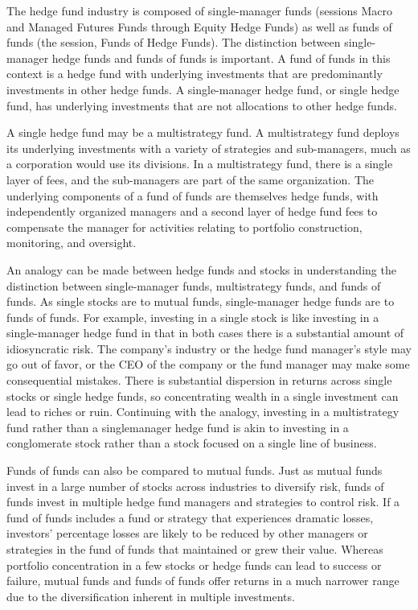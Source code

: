 \documentclass[11pt]{article}
\begin{document}
The hedge fund industry is composed of single-manager funds (sessions Macro and Managed Futures Funds through Equity Hedge Funds) as well as funds of funds (the session, Funds of Hedge Funds). The distinction between single-manager hedge funds and funds of funds is important. A fund of funds in this context is a hedge fund with underlying investments that are predominantly investments in other hedge funds. A single-manager hedge fund, or single hedge fund, has underlying investments that are not allocations to other hedge funds.

A single hedge fund may be a multistrategy fund. A multistrategy fund deploys its underlying investments with a variety of strategies and sub-managers, much as a corporation would use its divisions. In a multistrategy fund, there is a single layer of fees, and the sub-managers are part of the same organization. The underlying components of a fund of funds are themselves hedge funds, with independently organized managers and a second layer of hedge fund fees to compensate the manager for activities relating to portfolio construction, monitoring, and oversight.

An analogy can be made between hedge funds and stocks in understanding the distinction between single-manager funds, multistrategy funds, and funds of funds. As single stocks are to mutual funds, single-manager hedge funds are to funds of funds. For example, investing in a single stock is like investing in a single-manager hedge fund in that in both cases there is a substantial amount of idiosyncratic risk. The company's industry or the hedge fund manager's style may go out of favor, or the CEO of the company or the fund manager may make some consequential mistakes. There is substantial dispersion in returns across single stocks or single hedge funds, so concentrating wealth in a single investment can lead to riches or ruin. Continuing with the analogy, investing in a multistrategy fund rather than a singlemanager hedge fund is akin to investing in a conglomerate stock rather than a stock focused on a single line of business.

Funds of funds can also be compared to mutual funds. Just as mutual funds invest in a large number of stocks across industries to diversify risk, funds of funds invest in multiple hedge fund managers and strategies to control risk. If a fund of funds includes a fund or strategy that experiences dramatic losses, investors' percentage losses are likely to be reduced by other managers or strategies in the fund of funds that maintained or grew their value. Whereas portfolio concentration in a few stocks or hedge funds can lead to success or failure, mutual funds and funds of funds offer returns in a much narrower range due to the diversification inherent in multiple investments.
\end{document}
